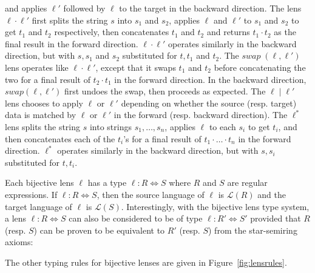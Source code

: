 \documentclass[acmsmall,review,anonymous]{acmart}\settopmatter{printfolios=true,printccs=false,printacmref=false}
\begin{document}
and applies $\ell'$ followed by $\ell$ to the target in the backward direction.
The lens $\ell \cdot \ell'$ first splits the string $s$ into $s_1$ and $s_2$,
applies $\ell$ and $\ell'$ to $s_1$ and $s_2$ to get $t_1$ and $t_2$
respectively, then concatenates $t_1$ and $t_2$ and returns $t_1 \cdot t_2$ as
the final result in the forward direction. $\ell \cdot \ell'$ operates
similarly in the backward direction, but with $s, s_1$ and $s_2$ substituted
for $t, t_1$ and $t_2$. The $\mathit{swap} \; (\ell, \ell')$ lens operates
like $\ell \cdot \ell'$, except that it swaps $t_1$ and $t_2$ before
concatenating the two for a final result of $t_2 \cdot t_1$ in the forward
direction. In the backward direction, $\mathit{swap}(\ell, \ell')$ first undoes
the swap, then proceeds as expected. The $\ell \; | \; \ell'$ lens
chooses to apply $\ell$ or $\ell'$ depending on whether the source
(resp. target) data is matched by $\ell$ or $\ell'$ in the forward (resp.
backward direction). The $\ell^*$ lens splits the string $s$ into strings $s_1,
\ldots, s_n$, applies $\ell$ to each $s_i$ to get $t_i$, and then concatenates
each of the $t_i$'s for a final result of $t_1 \cdot \ldots \cdot t_n$ in the
forward direction. $\ell^*$ operates similarly in the backward direction, but
with $s, s_i$ substituted for $t, t_i$.

Each bijective lens $\ell$ has a type $\ell : R \Leftrightarrow S$ where $R$ and
$S$ are regular expressions. If $\ell : R \Leftrightarrow S$, then the source
language of $\ell$ is $\mathcal{L}(R)$ and the target language of $\ell$ is
$\mathcal{L}(S)$. Interestingly, with the bijective lens type system, a lens
$\ell : R \Leftrightarrow S$ can also be considered to be of type $\ell : R'
\Leftrightarrow S'$ provided that $R$ (resp. $S$) can be proven to be
equivalent to $R'$ (resp. $S$) from the star-semiring axioms:

\begin{prooftree}
\end{prooftree}

The other typing rules for bijective lenses are given in
Figure~\ref{fig:lensrules}.
\end{document}
